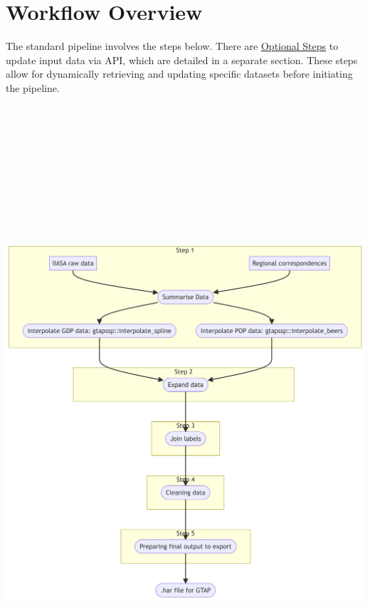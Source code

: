 \documentclass[
  letterpaper,
  DIV=11,
  numbers=noendperiod]{scrartcl}
\begin{document}
\section{Workflow Overview}\label{workflow-overview}

The standard pipeline involves the steps below. There are
\hyperref[optional-update-input-data]{Optional Steps} to update input
data via API, which are detailed in a separate section. These steps
allow for dynamically retrieving and updating specific datasets before
initiating the pipeline.

\label{workflow-pipeline}
\includegraphics[width=9.32in,height=9.25in]{index_files/figure-latex/mermaid-figure-1.png}
\end{document}
